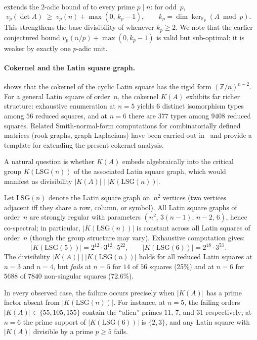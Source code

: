 \documentclass[11pt,a4paper]{article}
\newcommand{\ZZ}{\mathbb{Z}}
\newcommand{\FF}{\mathbb{F}}
\begin{document}
 extends the $2$-adic bound of
 to every prime $p\mid n$: for odd~$p$,
\[
  v_p(\det A)\;\ge\; v_p(n)+\max(0,\,k_p-1),
  \qquad k_p=\dim\ker_{\FF_p}(A\bmod p).
\]
This strengthens the base divisibility of  whenever
$k_p\ge 2$.  We note that the earlier conjectured bound
$v_p(n/p)+\max(0,k_p-1)$ is valid but sub-optimal: it is weaker by
exactly one $p$-adic unit.

\paragraph{Cokernel and the Latin square graph.}\label{sec:sandpile-LSG}

 shows that the cokernel of the cyclic
Latin square has the rigid form $(\ZZ/n)^{n-2}$.  For a general Latin
square of order~$n$, the cokernel $K(A)$ exhibits far richer
structure: exhaustive enumeration at $n=5$ yields $6$ distinct
isomorphism types among $56$ reduced squares, and at $n=6$ there are
$377$ types among $9408$ reduced squares.  Related Smith-normal-form
computations for combinatorially defined matrices (rook graphs, graph
Laplacians) have been carried out in~\cite{DGW16,Lorenzini08} and
provide a template for extending the present cokernel analysis.

A natural question is whether $K(A)$ embeds algebraically into the
critical group $K(\mathrm{LSG}(n))$ of the associated Latin square graph,
which would manifest as divisibility $|K(A)|\mid|K(\mathrm{LSG}(n))|$.

\begin{remark}\label{rem:C7}
Let $\mathrm{LSG}(n)$ denote the Latin square graph on~$n^2$ vertices
(two vertices adjacent iff they share a row, column, or symbol).
All Latin square graphs of order~$n$ are strongly regular with
parameters $(n^2,\,3(n{-}1),\,n{-}2,\,6)$, hence co-spectral;
in particular, $|K(\mathrm{LSG}(n))|$ is constant across all Latin
squares of order~$n$ (though the group structure may vary).
Exhaustive computation gives:
\[
  |K(\mathrm{LSG}(5))| = 2^{12}\cdot 3^{12}\cdot 5^{22},\qquad
  |K(\mathrm{LSG}(6))| = 2^{48}\cdot 3^{53}.
\]
The divisibility $|K(A)|\mid|K(\mathrm{LSG}(n))|$ holds for all reduced
Latin squares at $n=3$ and $n=4$, but \emph{fails} at $n=5$ for $14$
of $56$ squares (25\%) and at $n=6$ for $5688$ of $7840$ non-singular
squares (72.6\%).

In every observed case, the failure occurs precisely when $|K(A)|$ has
a prime factor absent from $|K(\mathrm{LSG}(n))|$.  For instance, at
$n=5$, the failing orders $|K(A)|\in\{55,105,155\}$ contain the
``alien'' primes $11$, $7$, and $31$ respectively; at $n=6$ the prime
support of $|K(\mathrm{LSG}(6))|$ is $\{2,3\}$, and any Latin square
with $|K(A)|$ divisible by a prime $p\ge 5$ fails.
\end{remark}
\end{document}
